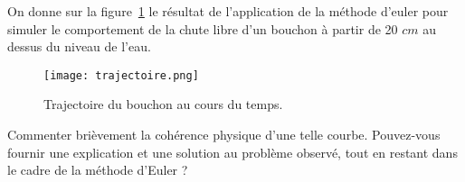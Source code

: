 \bigskip{}

On donne sur la figure~\ref{EQD-003:fig:trajectoire} le résultat de l'application de la méthode d'euler pour simuler le comportement de la chute libre d'un bouchon à partir de 20 $cm$ au dessus du niveau de l'eau.

\begin{figure}[!h]
    \begin{center}
        \texttt{[image: trajectoire.png]}
        \caption{Trajectoire du bouchon au cours du temps.}
        \label{EQD-003:fig:trajectoire}
    \end{center}
\end{figure}

\question{} Commenter brièvement la cohérence physique d'une telle courbe. Pouvez-vous fournir une explication et une solution au problème observé, tout en restant dans le cadre de la méthode d'Euler ? 

% 
% 
% 



